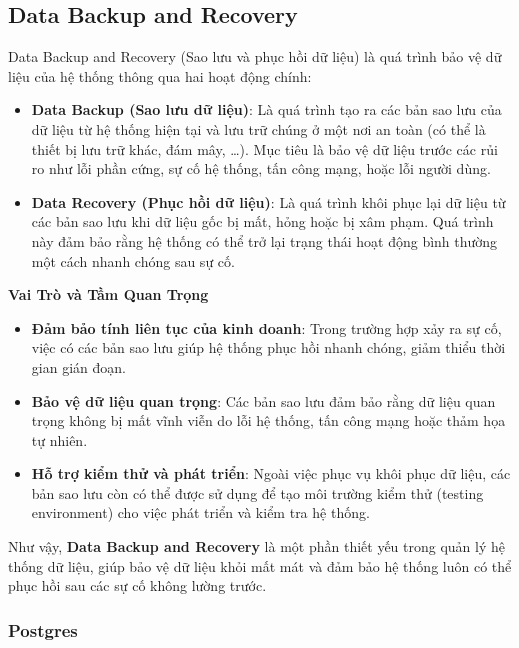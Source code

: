 \subsection{Data Backup and Recovery}

Data Backup and Recovery (Sao lưu và phục hồi dữ liệu) là quá trình bảo vệ dữ liệu của hệ thống thông qua hai hoạt động chính:

\begin{itemize}
    \item \textbf{Data Backup (Sao lưu dữ liệu)}: Là quá trình tạo ra các bản sao lưu của dữ liệu từ hệ thống hiện tại và lưu trữ chúng ở một nơi an toàn (có thể là thiết bị lưu trữ khác, đám mây, …). Mục tiêu là bảo vệ dữ liệu trước các rủi ro như lỗi phần cứng, sự cố hệ thống, tấn công mạng, hoặc lỗi người dùng.
    \item \textbf{Data Recovery (Phục hồi dữ liệu)}: Là quá trình khôi phục lại dữ liệu từ các bản sao lưu khi dữ liệu gốc bị mất, hỏng hoặc bị xâm phạm. Quá trình này đảm bảo rằng hệ thống có thể trở lại trạng thái hoạt động bình thường một cách nhanh chóng sau sự cố.
\end{itemize}

\noindent
\textbf{Vai Trò và Tầm Quan Trọng}

\begin{itemize}
    \item \textbf{Đảm bảo tính liên tục của kinh doanh}: Trong trường hợp xảy ra sự cố, việc có các bản sao lưu giúp hệ thống phục hồi nhanh chóng, giảm thiểu thời gian gián đoạn.
    \item \textbf{Bảo vệ dữ liệu quan trọng}: Các bản sao lưu đảm bảo rằng dữ liệu quan trọng không bị mất vĩnh viễn do lỗi hệ thống, tấn công mạng hoặc thảm họa tự nhiên.
    \item \textbf{Hỗ trợ kiểm thử và phát triển}: Ngoài việc phục vụ khôi phục dữ liệu, các bản sao lưu còn có thể được sử dụng để tạo môi trường kiểm thử (testing environment) cho việc phát triển và kiểm tra hệ thống.
\end{itemize}

Như vậy, \textbf{Data Backup and Recovery} là một phần thiết yếu trong quản lý hệ thống dữ liệu, giúp bảo vệ dữ liệu khỏi mất mát và đảm bảo hệ thống luôn có thể phục hồi sau các sự cố không lường trước.

\subsubsection{Postgres}

